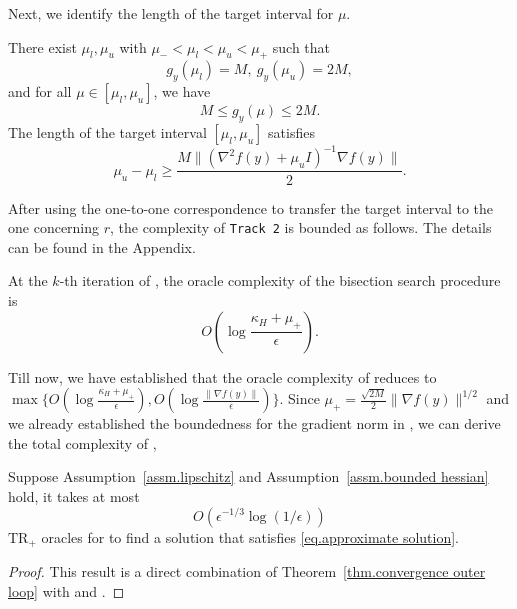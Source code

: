 \documentclass{mcom-l}
\newcommand{\trp}{\textrm{TR}_+}
\numberwithin{equation}{section}
\begin{document}
Next, we identify the length of the target interval for $\mu$.
\begin{lemma}
    \label{lem.bound target interval}
    There exist $\mu_l,\mu_u$ with $\mu_-<\mu_l<\mu_u<\mu_+$ such that
    \begin{equation}\label{eq.target interval bracketing points}
        g_{y}(\mu_l)=M, \ g_{y}(\mu_u)=2M,
    \end{equation}
    and for all $\mu\in[\mu_l,\mu_u]$, we have
    \begin{equation*}
        M\leq g_y(\mu) \leq2M.
    \end{equation*}
    The length of the target interval $[\mu_l,\mu_u]$ satisfies
    \begin{equation}
        \label{eq.bound target interval}
        \mu_u-\mu_l \geq \frac{M\|\left (\nabla ^2 f(y)+\mu_u I \right )^{-1}\nabla f(y)\|}{2}.
    \end{equation}
\end{lemma}
After using the one-to-one correspondence to transfer the target interval to the one concerning $r$, the complexity of \texttt{Track 2} is bounded as follows. The details can be found in the Appendix.
\begin{lemma}
    \label{lem.bound initial interval}
    At the $k$-th iteration of , the oracle complexity of the bisection search procedure is
    \begin{equation}
        \label{eq.complexity bisection}
        O\left(\log\frac{\kappa_H+\mu_+}{\epsilon}\right).
    \end{equation}
\end{lemma}


Till now, we have established that the oracle complexity of  reduces to $\max\{O\left(\log\frac{\kappa_H+\mu_+}{\epsilon}\right),O\left(\log \frac{\|\nabla f(y)\|}{\epsilon}\right)\}$. Since $\mu_+ = \frac{\sqrt{2M}}{2}\|\nabla f(y)\|^{1/2}$ and we already established the boundedness for the gradient norm in , we can derive the total complexity of ,
\begin{theorem}
    \label{thm.total complexity newton}
    Suppose Assumption~\ref{assm.lipschitz} and Assumption~\ref{assm.bounded hessian} hold, it takes at most
    \begin{equation}\label{eq.total complexity newton}
        O\left (\epsilon^{-1/3}\log \left(1/\epsilon\right)\right)
    \end{equation}
    $\trp$ oracles for  to find a solution that satisfies \eqref{eq.approximate solution}.
\end{theorem}
\begin{proof}
    This result is a direct combination of Theorem~\ref{thm.convergence outer loop} with  and .
\end{proof}
\end{document}
